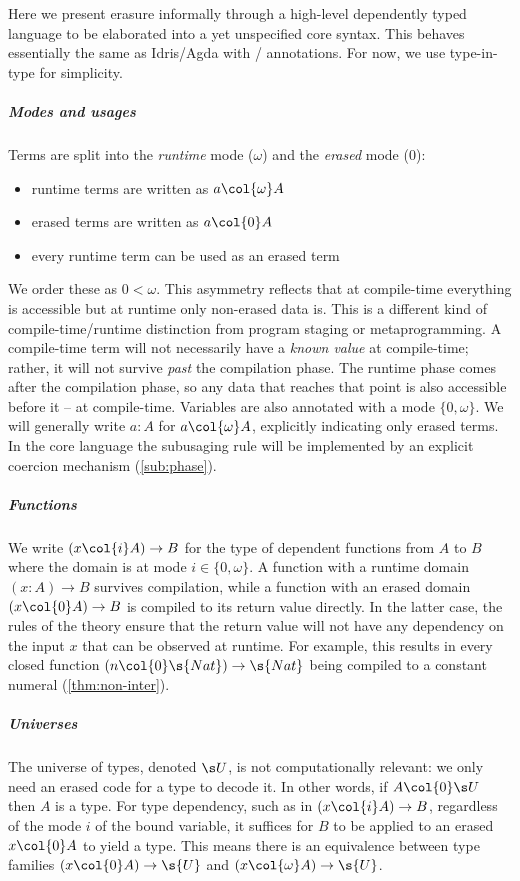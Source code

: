 \documentclass[a4paper,UKenglish,cleveref,autoref,thm-restate]{lipics-v2021}
\begin{document}
Here we present erasure informally through a high-level dependently typed
language to be elaborated into a yet unspecified core syntax. This behaves
essentially the same as Idris/Agda with / annotations. For now, we
use type-in-type for simplicity.

\subparagraph{Modes and usages}

Terms are split into the \emph{runtime} mode ($\omega$) and the
\emph{erased} mode ($0$):
\begin{itemize}
    \item runtime terms are written as $a \col{\omega} A$
    \item erased terms are written as $a \col{0} A$
    \item every runtime term can be used as an erased term
\end{itemize}
We order these as $0 < \omega$. This asymmetry reflects that at compile-time
everything is accessible but at runtime only non-erased data is. This is a
different kind of compile-time/runtime distinction from program staging or
metaprogramming. A compile-time term will not necessarily have a \emph{known
value} at compile-time; rather, it will not survive \emph{past} the compilation
phase. The runtime phase comes after the compilation phase, so any data that
reaches that point is also accessible before it -- at compile-time. Variables
are also annotated with a mode $\{0, \omega\}$. We will generally write $a : A$
for $a \col{\omega} A$, explicitly indicating only erased terms. In the core
language the subusaging rule will be implemented by an explicit coercion
mechanism (\cref{sub:phase}).

\subparagraph{Functions}\label{ssub:dep-funcs} We write $(x \col{i} A) \to B$
for the type of dependent functions from $A$ to $B$ where the domain is at mode
$i \in \{0, \omega\}$. A function with a runtime domain $(x : A) \to B$ survives
compilation, while a function with an erased domain $(x \col{0} A) \to B$ is
compiled to its return value directly. In the latter case, the rules of the
theory ensure that the return value will not have any dependency on the input
$x$ that can be observed at runtime. For example, this results in every closed
function $(n \col{0} \s{Nat}) \to \s{Nat}$ being compiled to a constant numeral
(\cref{thm:non-inter}).

\subparagraph{Universes}\label{ssub:universes} The universe of types, denoted
$\s U$, is not computationally relevant: we only need an erased code for a type
to decode it. In other words, if $A \col{0} \s U$ then $A$ is a type. For type
dependency, such as in $(x \col{i} A) \to B$, regardless of the mode $i$ of the
bound variable, it suffices for $B$ to be applied to an erased $x \col{0} A$ to
yield a type. This means there is an equivalence between type families $(x
\col{0} A) \to \s{U}$ and $(x \col{\omega} A) \to \s{U}$.
\end{document}

